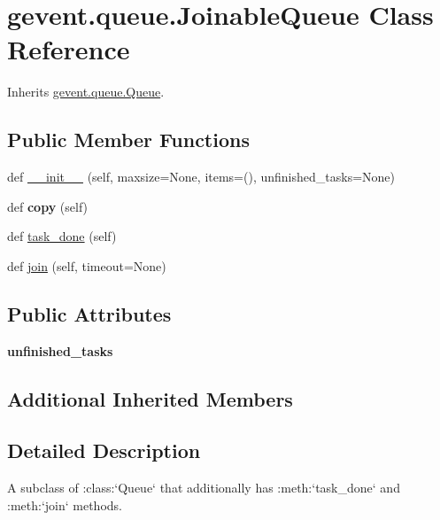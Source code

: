 \hypertarget{classgevent_1_1queue_1_1_joinable_queue}{}\section{gevent.\+queue.\+Joinable\+Queue Class Reference}
\label{classgevent_1_1queue_1_1_joinable_queue}


Inherits \hyperlink{classgevent_1_1queue_1_1_queue}{gevent.\+queue.\+Queue}.

\subsection*{Public Member Functions}
\begin{DoxyCompactItemize}
\item 
def \hyperlink{classgevent_1_1queue_1_1_joinable_queue_a99c05d351491a21ec311394bbb440de3}{\+\_\+\+\_\+init\+\_\+\+\_\+} (self, maxsize=None, items=(), unfinished\+\_\+tasks=None)
\item 
\mbox{\label{classgevent_1_1queue_1_1_joinable_queue_af2353c6834babbda41a51377278c33c7}} 
def {\bfseries copy} (self)
\item 
def \hyperlink{classgevent_1_1queue_1_1_joinable_queue_aa6f6253b94a3cbd933af41d61fd5d81d}{task\+\_\+done} (self)
\item 
def \hyperlink{classgevent_1_1queue_1_1_joinable_queue_aa0916671ac43612e82934e6c8c1b3283}{join} (self, timeout=None)
\end{DoxyCompactItemize}
\subsection*{Public Attributes}
\begin{DoxyCompactItemize}
\item 
\mbox{\label{classgevent_1_1queue_1_1_joinable_queue_abbafa22f37f255728b599fc8624a8508}} 
{\bfseries unfinished\+\_\+tasks}
\end{DoxyCompactItemize}
\subsection*{Additional Inherited Members}


\subsection{Detailed Description}
\begin{DoxyVerb}A subclass of :class:`Queue` that additionally has
:meth:`task_done` and :meth:`join` methods.
\end{DoxyVerb}
 


